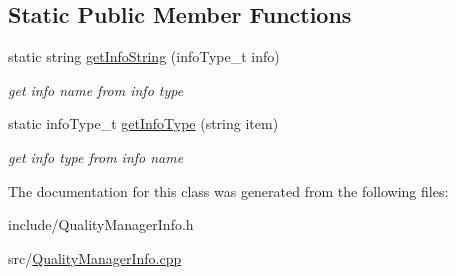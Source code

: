 \subsection*{Static Public Member Functions}
\begin{DoxyCompactItemize}
\item 
\mbox{\label{classQualityManagerInfo_ae8fd4845dac58691da2f37039f60583a}} 
static string \hyperlink{classQualityManagerInfo_ae8fd4845dac58691da2f37039f60583a}{get\+Info\+String} (info\+Type\+\_\+t info)
\begin{DoxyCompactList}\small\item\em get info name from info type \end{DoxyCompactList}\item 
\mbox{\label{classQualityManagerInfo_a0ca0440d6aa4ee8fa344edce0330e497}} 
static info\+Type\+\_\+t \hyperlink{classQualityManagerInfo_a0ca0440d6aa4ee8fa344edce0330e497}{get\+Info\+Type} (string item)
\begin{DoxyCompactList}\small\item\em get info type from info name \end{DoxyCompactList}\end{DoxyCompactItemize}


The documentation for this class was generated from the following files\+:\begin{DoxyCompactItemize}
\item 
include/Quality\+Manager\+Info.\+h\item 
src/\hyperlink{QualityManagerInfo_8cpp}{Quality\+Manager\+Info.\+cpp}\end{DoxyCompactItemize}
